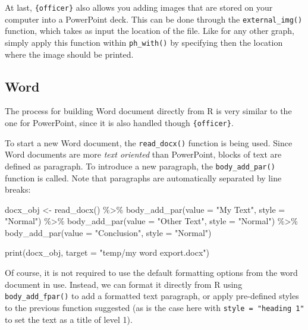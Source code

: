 \documentclass[
]{book}
\newenvironment{Shaded}{\begin{snugshade}}{\end{snugshade}}
\newcommand{\AttributeTok}[1]{\textcolor[rgb]{0.77,0.63,0.00}{#1}}
\newcommand{\FunctionTok}[1]{\textcolor[rgb]{0.00,0.00,0.00}{#1}}
\newcommand{\NormalTok}[1]{#1}
\newcommand{\OtherTok}[1]{\textcolor[rgb]{0.56,0.35,0.01}{#1}}
\newcommand{\SpecialCharTok}[1]{\textcolor[rgb]{0.00,0.00,0.00}{#1}}
\newcommand{\StringTok}[1]{\textcolor[rgb]{0.31,0.60,0.02}{#1}}
\begin{document}
At last, \texttt{\{officer\}} also allows you adding images that are stored on your computer into a PowerPoint deck. This can be done through the \texttt{external\_img()} function, which takes as input the location of the file. Like for any other graph, simply apply this function within \texttt{ph\_with()} by specifying then the location where the image should be printed.

\hypertarget{word}{%
\subsection{Word}\label{word}}

The process for building Word document directly from R is very similar to the one for PowerPoint, since it is also handled though \texttt{\{officer\}}.

To start a new Word document, the \texttt{read\_docx()} function is being used. Since Word documents are more \emph{text oriented} than PowerPoint, blocks of text are defined as paragraph. To introduce a new paragraph, the \texttt{body\_add\_par()} function is called. Note that paragraphs are automatically separated by line breaks:

\begin{Shaded}
\begin{Highlighting}[]
\NormalTok{docx\_obj }\OtherTok{\textless{}{-}} \FunctionTok{read\_docx}\NormalTok{() }\SpecialCharTok{\%\textgreater{}\%} 
  \FunctionTok{body\_add\_par}\NormalTok{(}\AttributeTok{value =} \StringTok{"My Text"}\NormalTok{, }\AttributeTok{style =} \StringTok{"Normal"}\NormalTok{) }\SpecialCharTok{\%\textgreater{}\%}
  \FunctionTok{body\_add\_par}\NormalTok{(}\AttributeTok{value =} \StringTok{"Other Text"}\NormalTok{, }\AttributeTok{style =} \StringTok{"Normal"}\NormalTok{) }\SpecialCharTok{\%\textgreater{}\%} 
  \FunctionTok{body\_add\_par}\NormalTok{(}\AttributeTok{value =} \StringTok{"Conclusion"}\NormalTok{, }\AttributeTok{style =} \StringTok{"Normal"}\NormalTok{)}

\FunctionTok{print}\NormalTok{(docx\_obj, }\AttributeTok{target =} \StringTok{"temp/my word export.docx"}\NormalTok{)}
\end{Highlighting}
\end{Shaded}

Of course, it is not required to use the default formatting options from the word document in use. Instead, we can format it directly from R using \texttt{body\_add\_fpar()} to add a formatted text paragraph, or apply pre-defined styles to the previous function suggested (as is the case here with \texttt{style\ =\ "heading\ 1"} to set the text as a title of level 1).
\end{document}
